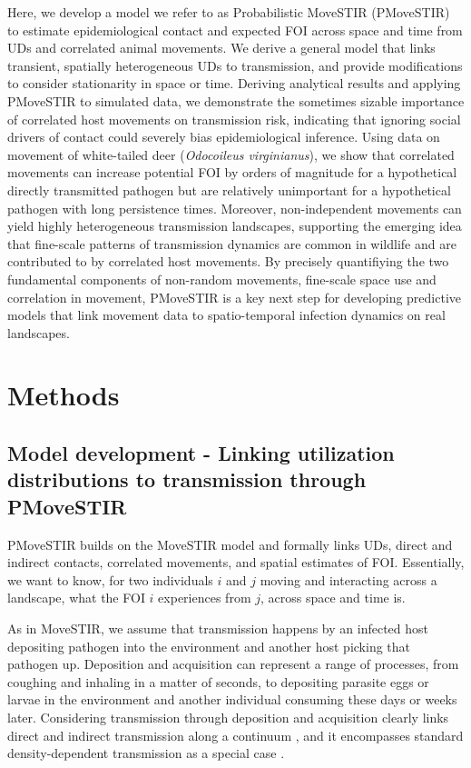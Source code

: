 \documentclass[letterpaper]{article}
\begin{document}
Here, we develop a model we refer to as Probabilistic MoveSTIR (PMoveSTIR) to estimate epidemiological contact and expected FOI across space and time from UDs and correlated animal movements. We derive a general model that links transient, spatially heterogeneous UDs to transmission, and provide modifications to consider stationarity in space or time.
Deriving analytical results and applying PMoveSTIR to simulated data, we demonstrate the sometimes sizable importance of correlated host movements on  transmission risk, indicating that ignoring social drivers of contact could severely bias epidemiological inference. Using data on movement of white-tailed deer (\emph{Odocoileus virginianus}), we show that correlated movements can increase potential FOI by orders of magnitude for a hypothetical directly transmitted pathogen but are relatively unimportant for a hypothetical pathogen with long persistence times. Moreover, non-independent movements can yield highly heterogeneous transmission landscapes, supporting the emerging idea that fine-scale patterns of transmission dynamics are common in wildlife \citep{Albery2021} and are contributed to by correlated host movements. By precisely quantifiying the two fundamental components of non-random movements, fine-scale space use and correlation in movement, PMoveSTIR is a key next step for developing predictive models that link movement data to spatio-temporal infection dynamics on real landscapes.

\section*{Methods}

\subsection*{Model development - Linking utilization distributions to transmission through PMoveSTIR}

PMoveSTIR builds on the MoveSTIR model \citep{Wilber2022} and formally links UDs, direct and indirect contacts, correlated movements, and spatial estimates of FOI. Essentially, we want to know, for two individuals $i$ and $j$ moving and interacting across a landscape, what the FOI $i$ experiences from $j$, across space and time is.  

As in MoveSTIR, we assume that transmission happens by an infected host depositing pathogen into the environment and another host picking that pathogen up. 
Deposition and acquisition can represent a range of processes, from coughing and inhaling in a matter of seconds, to depositing parasite eggs or larvae in the environment and another individual consuming these days or weeks later. 
Considering transmission through deposition and acquisition clearly links direct and indirect transmission along a continuum \citep{Wilber2022}, and it encompasses standard density-dependent transmission as a special case \citep{Cortez2021}. 
\end{document}
